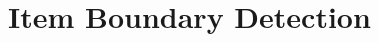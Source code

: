 \documentclass[12pt,a4paper,oneside]{report}
\begin{document}
\section{Item Boundary Detection}
\label{sec:boundary_detection}
\end{document}
